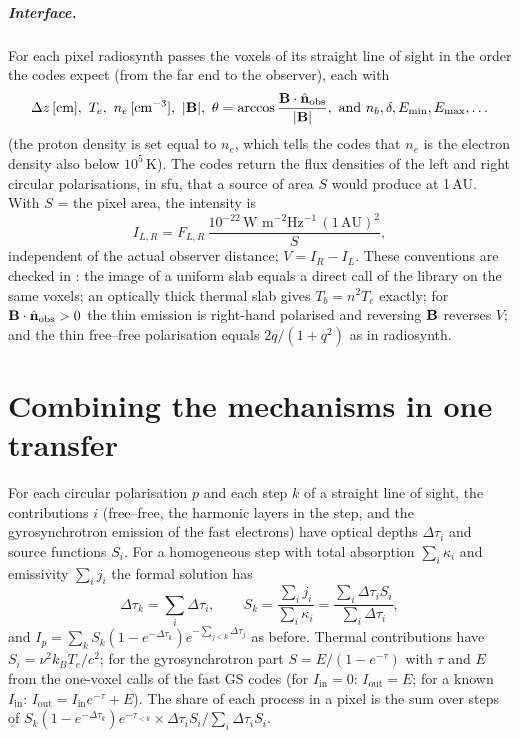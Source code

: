 \paragraph{Interface.} For each pixel radiosynth passes the voxels of its straight line
of sight in the order the codes expect (from the far end to the observer), each with
\begin{equation*}
 \Delta z\,[\text{cm}],\ T_e,\ n_e\,[\text{cm}^{-3}],\ |\vect B|,\
 \theta=\arccos\frac{\vect B\cdot\hat{\vect n}_\text{obs}}{|\vect B|},\ 
 \text{and } n_b, \delta, E_\text{min}, E_\text{max}, \ldots
\end{equation*}
(the proton density is set equal to $n_e$, which tells the codes that $n_e$ is the electron
density also below $10^5$\,K). The codes return the flux densities of the left and right
circular polarisations, in sfu, that a source of area $S$ would produce at 1\,AU. With
$S$ = the pixel area, the intensity is
\begin{equation}
  I_{L,R}=F_{L,R}\,\frac{10^{-22}\,\text{W m}^{-2}\text{Hz}^{-1}\,(1\,\text{AU})^2}{S},
\end{equation}
independent of the actual observer distance; $V=I_R-I_L$. These conventions are checked
in : the image of a uniform slab equals a direct call
of the library on the same voxels; an optically thick thermal slab gives $T_b=n^2T_e$
exactly; for $\mathbf{B}\cdot\hat{\mathbf{n}}_\text{obs}>0$ the thin emission is right-hand
polarised and reversing $\mathbf{B}$ reverses $V$; and the thin free--free polarisation
equals $2q/(1+q^2)$ as in radiosynth.

\chapter{Combining the mechanisms in one transfer}\label{chap:cbtheory}

For each circular polarisation $p$ and each step $k$ of a straight line of sight, the
contributions $i$ (free--free, the harmonic layers in the step, and the gyrosynchrotron
emission of the fast electrons) have optical depths $\Delta\tau_{i}$ and source functions
$S_{i}$. For a homogeneous step with total absorption $\sum_i\kappa_i$ and emissivity
$\sum_i j_i$ the formal solution has
\begin{equation}
  \Delta\tau_k=\sum_i\Delta\tau_i,\qquad
  S_k=\frac{\sum_i j_i}{\sum_i\kappa_i}=\frac{\sum_i\Delta\tau_i S_i}{\sum_i\Delta\tau_i},
\end{equation}
and $I_p=\sum_k S_k(1-e^{-\Delta\tau_k})e^{-\sum_{j<k}\Delta\tau_j}$ as before. Thermal
contributions have $S_i=\nu^2k_BT_e/c^2$; for the gyrosynchrotron part
$S=E/(1-e^{-\tau})$ with $\tau$ and $E$ from the one-voxel calls of the fast GS codes
(for $I_\text{in}=0$: $I_\text{out}=E$; for a known $I_\text{in}$:
$I_\text{out}=I_\text{in}e^{-\tau}+E$). The share of each process in a pixel is the sum
over steps of $S_k(1-e^{-\Delta\tau_k})e^{-\tau_{<k}}\times\Delta\tau_iS_i/\sum_i\Delta\tau_iS_i$.

